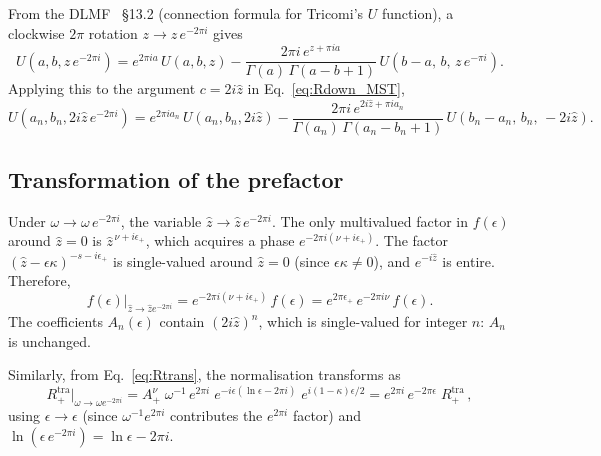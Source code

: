 \documentclass[12pt,a4paper]{article}
\begin{document}
From the DLMF~\cite{DLMF} \S13.2 (connection formula for Tricomi's $U$ function),
a clockwise $2\pi$ rotation $z \to z\,e^{-2\pi i}$ gives
\begin{equation}
  U(a,b,z\,e^{-2\pi i})
  = e^{2\pi i a}\,U(a,b,z)
    - \frac{2\pi i\,e^{z + \pi i a}}
           {\Gamma(a)\,\Gamma(a-b+1)}\,
    U(b-a,\,b,\,z\,e^{-\pi i}).
  \label{eq:DLMF_conn}
\end{equation}
Applying this to the argument $c = 2i\hat{z}$ in Eq.~\eqref{eq:Rdown_MST},
\begin{equation}
  U(a_n, b_n, 2i\hat{z}\,e^{-2\pi i})
  = e^{2\pi i a_n}\,U(a_n, b_n, 2i\hat{z})
    - \frac{2\pi i\,e^{2i\hat{z} + \pi i a_n}}
           {\Gamma(a_n)\,\Gamma(a_n - b_n + 1)}\,
    U(b_n - a_n,\,b_n,\,-2i\hat{z}).
  \label{eq:U_rotated}
\end{equation}

\subsection{Transformation of the prefactor}

Under $\omega \to \omega\,e^{-2\pi i}$, the variable $\hat{z} \to \hat{z}\,e^{-2\pi i}$.
The only multivalued factor in $f(\epsilon)$ around $\hat{z} = 0$ is
$\hat{z}^{\,\nu+i\epsilon_+}$, which acquires a phase
$e^{-2\pi i(\nu + i\epsilon_+)}$.
The factor $(\hat{z} - \epsilon\kappa)^{-s-i\epsilon_+}$ is
single-valued around $\hat{z} = 0$ (since $\epsilon\kappa \neq 0$),
and $e^{-i\hat{z}}$ is entire.  Therefore,
\begin{equation}
  f(\epsilon)\Big|_{\hat{z}\to\hat{z}e^{-2\pi i}}
  = e^{-2\pi i(\nu + i\epsilon_+)}\,f(\epsilon)
  = e^{2\pi\epsilon_+}\,e^{-2\pi i\nu}\,f(\epsilon).
  \label{eq:f_rotated}
\end{equation}
The coefficients $A_n(\epsilon)$ contain $(2i\hat{z})^n$, which
is single-valued for integer $n$: $A_n$ is unchanged.

Similarly, from Eq.~\eqref{eq:Rtrans}, the normalisation transforms as
\begin{equation}
  R^{\mathrm{tra}}_+\Big|_{\omega\to\omega e^{-2\pi i}}
  = A^\nu_+\;\omega^{-1}\,e^{2\pi i}\;
    e^{-i\epsilon(\ln\epsilon - 2\pi i)}\;
    e^{i(1-\kappa)\epsilon/2}
  = e^{2\pi i}\,e^{-2\pi\epsilon}\;R^{\mathrm{tra}}_+\,,
  \label{eq:Rtra_rotated}
\end{equation}
using $\epsilon\to\epsilon$ (since $\omega^{-1} e^{2\pi i}$ contributes
the $e^{2\pi i}$ factor) and
$\ln(\epsilon\,e^{-2\pi i}) = \ln\epsilon - 2\pi i$.
\end{document}
